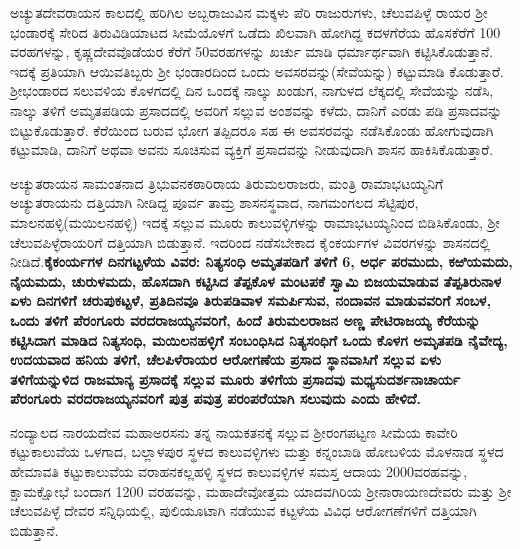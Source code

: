 ಅಚ್ಯುತದೇವರಾಯನ ಕಾಲದಲ್ಲಿ ಹರಿಗಿಲ ಅಬ್ಬರಾಜುವಿನ ಮಕ್ಕಳು ಪೆರಿ ರಾಜುರುಗಳು, ಚೆಲುವಪಿಳ್ಳೆ ರಾಯರ ಶ‍್ರೀ ಭಂಡಾರಕ್ಕೆ ಸೇರಿದ ತಿರುವಿಡಿಯಾಟದ ಸೀಮೆಯೊಳಗೆ ಒಡೆದು ಖಿಲವಾಗಿ ಹೋಗಿದ್ದ ಕದಳಗೆರೆಯ ಹೊಸಕೆರೆಗೆ 100 ವರಹಗಳನ್ನು, ಕೃಷ್ಣದೇವವೊಡೆಯರ ಕೆರೆಗೆ 50ವರಹಗಳನ್ನು ಖರ್ಚು ಮಾಡಿ ಧರ್ಮಾರ್ಥವಾಗಿ ಕಟ್ಟಿಸಿಕೊಡುತ್ತಾನೆ. ಇದಕ್ಕೆ ಪ್ರತಿಯಾಗಿ ಆಯಿವತಿಬ್ಬರು ಶ‍್ರೀ ಭಂಡಾರದಿಂದ ಒಂದು ಅವಸರವನ್ನು(ಸೇವೆಯನ್ನು) ಕಟ್ಟುಮಾಡಿ ಕೊಡುತ್ತಾರೆ. ಶ‍್ರೀಭಂಡಾರದ ಸಲುವಳಿಯ ಕೊಳಗದಲ್ಲಿ ದಿನ ಒಂದಕ್ಕೆ ನಾಲ್ಕು ಖಂಡುಗ, ನಾಗುಳದ ಲೆಕ್ಕದಲ್ಲಿ ಸೇವೆಯನ್ನು ನಡೆಸಿ, ನಾಲ್ಕು ತಳಿಗೆ ಅಮೃತಪಡಿಯ ಪ್ರಸಾದದಲ್ಲಿ ಅವರಿಗೆ ಸಲ್ಲುವ ಅಂಶವನ್ನು ಕಳೆದು, ದಾನಿಗೆ ಎರಡು ಪಡಿ ಪ್ರಸಾದವನ್ನು ಬಿಟ್ಟುಕೊಡುತ್ತಾರೆ. ಕೆರೆಯಿಂದ ಬರುವ ಭೋಗ ತಪ್ಪಿದರೂ ಸಹ ಈ ಅವಸರವನ್ನು ನಡೆಸಿಕೊಂಡು ಹೋಗುವುದಾಗಿ ಕಟ್ಟು\-ಮಾಡಿ, ದಾನಿಗೆ ಅಥವಾ ಅವನು ಸೂಚಿಸುವ ವ್ಯಕ್ತಿಗೆ ಪ್ರಸಾದವನ್ನು ನೀಡುವುದಾಗಿ ಶಾಸನ ಹಾಕಿಸಿಕೊಡುತ್ತಾರೆ.

ಅಚ್ಯುತರಾಯನ ಸಾಮಂತನಾದ ತ್ರಿಭುವನಕಠಾರಿರಾಯ ತಿರುಮಲರಾಜರು, ಮಂತ್ರಿ ರಾಮಾಭಟಯ್ಯನಿಗೆ ಅಚ್ಯುತರಾಯನು ದತ್ತಿಯಾಗಿ ನೀಡಿದ್ದ ಪೂರ್ವ ತಾಮ್ರ ಶಾಸನಸ್ಥವಾದ, ನಾಗಮಂಗಲದ ಸೆಟ್ಟಿಪುರ, ಮಾಲನಹಳ್ಳಿ\break (ಮಯಿಲನಹಳ್ಳಿ) ಇದಕ್ಕೆ ಸಲ್ಲುವ ಮೂರು ಕಾಲುವಳ್ಳಿಗಳನ್ನು ರಾಮಾಭಟಯ್ಯನಿಂದ ಬಿಡಿಸಿಕೊಂಡು, ಶ‍್ರೀ ಚೆಲುವಪಿಳ್ಳೆರಾಯರಿಗೆ ದತ್ತಿಯಾಗಿ ಬಿಡುತ್ತಾನೆ. ಇದರಿಂದ ನಡೆಸಬೇಕಾದ ಕೈಂಕರ್ಯಗಳ ವಿವರಗಳನ್ನು ಶಾಸನದಲ್ಲಿ ನೀಡಿದೆ.\textbf{ಕೈಕಂರ್ಯಗಳ ದಿನಗಟ್ಟಳೆಯ ವಿವರ: ನಿತ್ಯಸಂಧಿ ಅಮೃತಪಡಿಗೆ ತಳಿಗೆ 6, ಅರ್ಧ ಪರಮುದು, ಕಱಿಯಮದು, ನೈಯಮದು, ಚುರುಳಮದು, ಹೊಸದಾಗಿ ಕಟ್ಟಿಸಿದ ತೆಪ್ಪಕೊಳ ಮಂಟಪಕೆ ಸ್ವಾಮಿ ಬಿಜಯಮಾಡುವ ತೆಪ್ಪತಿರುನಾಳ ಏಳು ದಿನಗಳಿಗೆ ಚರುಪುಕಟ್ಟಳೆ, ಪ್ರತಿದಿನವೂ ತಿರುಪಡಿವಾಳ ಸಮರ್ಪಿಸುವ, ನಂದಾವನ ಮಾಡುವವರಿಗೆ ಸಂಬಳ, ಒಂದು ತಳಿಗೆ ಪೆರಂಗೂರು ವರದರಾಜಯ್ಯನವರಿಗೆ, ಹಿಂದೆ ತಿರುಮಲರಾಜನ ಅಣ್ಣ ಪೇಟಿರಾಜಯ್ಯ ಕೆರೆಯನ್ನು ಕಟ್ಟಿಸಿದಾಗ ಮಾಡಿದ ನಿತ್ಯಸಂಧಿ, ಮಯಿಲನಹಳ್ಳಿಗೆ ಸಂಬಂಧಿಸಿದ ನಿತ್ಯಸಂಧಿಗೆ ಒಂದು ಕೊಳಗ ಅಮೃತಪಡಿ ನೈವೇದ್ಯ, ಉದಯವಾದ ಹನಿಯ ತಳಿಗೆ, ಚೆಲಪಿಳೆರಾಯರ ಆರೋಗಣೆಯ ಪ್ರಸಾದ ಸ್ಥಾನವಾಸಿಗೆ ಸಲ್ಲುವ ಏಳು ತಳಿಗೆಯನ್ನುಳಿದ ರಾಜಮಾನ್ಯ ಪ್ರಸಾದಕ್ಕೆ ಸಲ್ಲುವ ಮೂರು ತಳಿಗೆಯ ಪ್ರಸಾದವು ಮಧ್ಯಸುದರ್ಶನಾಚಾರ್ಯ ಪೆರಂಗೂರು ವರದರಾಜಯ್ಯನವರಿಗೆ ಪುತ್ರ ಪವುತ್ರ ಪರಂಪರೆಯಾಗಿ ಸಲುವುದು ಎಂದು ಹೇಳಿದೆ.}

ನಂದ್ಯಾಲದ ನಾರಯದೇವ ಮಹಾಅರಸನು ತನ್ನ ನಾಯಕತನಕ್ಕೆ ಸಲ್ಲುವ ಶ‍್ರೀರಂಗಪಟ್ಟಣ ಸೀಮೆಯ ಕಾವೇರಿ ಕಟ್ಟುಕಾಲುವೆಯ ಒಳಗಾದ, ಬಲ್ಲಾಳಪುರ ಸ್ಥಳದ ಕಾಲುವಳ್ಳಿಗಳು ಮತ್ತು ಕನ್ನಂಬಾಡಿ ಹೋಬಳಿಯ ಮೊಳನಾಡ ಸ್ಥಳದ ಹೇಮಾವತಿ ಕಟ್ಟುಕಾಲುವೆಯ ವರಾಹನಕಲ್ಲಹಳ್ಳಿ ಸ್ಥಳದ ಕಾಲುವಳ್ಳಿಗಳ ಸಮಸ್ತ ಆದಾಯ 2000ವರಹವನ್ನು, ಕ್ಷಾಮಕ್ಷೋಭೆ ಬಂದಾಗ 1200 ವರಹವನ್ನು, ಮಹಾದೇವೋತ್ತಮ ಯಾದವಗಿರಿಯ ಶ‍್ರೀನಾರಾಯಣದೇವರು ಮತ್ತು ಶ‍್ರೀ ಚೆಲುವಪಿಳ್ಳೆ ದೇವರ ಸನ್ನಿಧಿಯಲ್ಲಿ, ಪುಲಿಯೂಟಾಗಿ ನಡೆಯುವ ಕಟ್ಟಳೆಯ ವಿವಿಧ ಆರೋಗಣೆಗಳಿಗೆ ದತ್ತಿಯಾಗಿ ಬಿಡುತ್ತಾನೆ.

